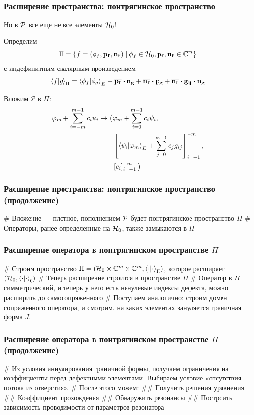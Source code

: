\documentclass{beamer}
\begin{document}
\begin{frame}[fragile]
\frametitle{Расширение пространства: понтрягинское пространство}
Но в $\mathcal{P}$ все еще не все элементы $\mathcal{H}_{0}$!

Определим 
\[
\Pi = \{f = (\phi_f, \vb{p_f}, \vb{n_f}) \mid \phi_f \in \mathcal{H}_{0}, \vb{p_f}, \vb{n_f} \in \mathbb{C}^m \}
\]
с индефинитным скалярным произведением
\[
\ip{f}{g}_\Pi =
\ip{\phi_f}{\phi_g}_E +
\cconj{\vb{p_f}} \vdot \vb{n_g} +
\cconj{\vb{n_f}} \vdot \vb{p_g} + 
\cconj{\vb{n_f}} \vdot \vb{g_{ij}} \vdot \vb{n_g}
\]

Вложим $\mathcal{P}$ в $\Pi$:
\begin{align*}
\varphi_m + \sum\limits_{i = -m}^{m - 1} c_i \psi_i \mapsto
\big(
& \varphi_m + \sum\limits_{i = 0}^{m - 1} c_i \psi_i, \\
& \left[ \ip{\psi_i}{\varphi_m}_E + \sum\limits_{j = 0}^{m - 1} c_j g_{ij} \right]_{i = -1}^{-m}, \\
& \left[ c_i \right]_{i = -1}^{-m}  \big)
\end{align*}
\end{frame}


\begin{frame}[fragile]
\frametitle{Расширение пространства: понтрягинское пространство (продолжение)}
\begin{easylist}[itemize]
# Вложение — плотное, пополнением $\mathcal{P}$ будет понтрягинское пространство $\Pi$
# Операторы, ранее определенные на $\mathcal{H}_{0}$, также замыкаются в $\Pi$
\end{easylist}
\end{frame}

\begin{frame}[fragile]
\frametitle{Расширение оператора в понтрягинском пространстве $\Pi$}
\begin{easylist}[itemize]
# Строим пространство $\Pi = (\hilb{0} \times \bbC^m \times \bbC^m, \ip{\cdot}{\cdot}_\Pi)$, которое расширяет $(\hilb{0}, \ip{\cdot}{\cdot}_0)$
# Теперь расширение строится в пространстве $\Pi$
# Оператор в $\Pi$ симметрический, и теперь у него есть ненулевые индексы дефекта, можно расширить до самосопряженного
# Поступаем аналогично: строим домен сопряженного оператора, и смотрим, на каких элементах зануляется граничная форма $J$. 
\end{easylist}
\end{frame}


\begin{frame}[fragile]
\frametitle{Расширение оператора в понтрягинском пространстве $\Pi$ (продолжение)}
\begin{easylist}[itemize]
# Из условия аннулирования граничной формы, получаем ограничения на коэффициенты перед дефектными элементами. Выбираем условие «отсутствия потока из отверстия».
# После этого можем:
## Получить решения уравнения
## Коэффициент прохождения
## Обнаружить резонансы
## Построить зависимость проводимости от параметров резонатора
\end{easylist}
\end{frame}
\end{document}

